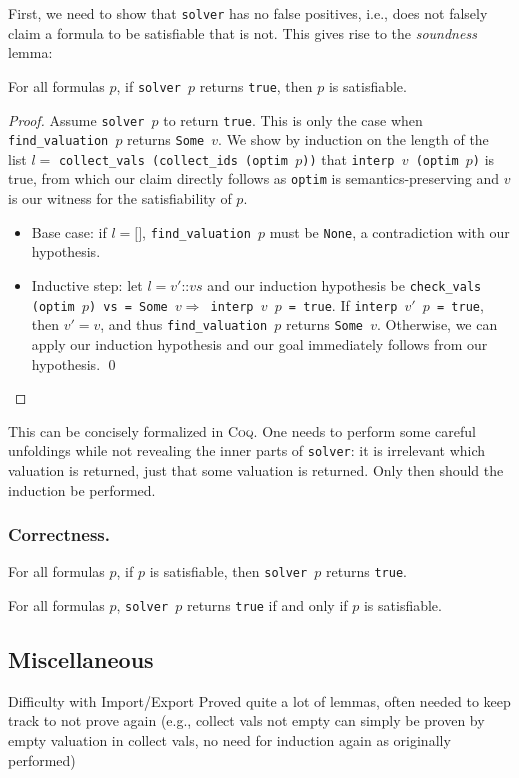 First, we need to show that \texttt{solver} has no false positives, i.e., does not falsely claim a formula to be satisfiable that is not.
This gives rise to the \emph{soundness} lemma:
\begin{lemma}
    For all formulas $p$, if \texttt{solver $p$} returns \texttt{true}, then $p$ is satisfiable.
\end{lemma}
\begin{proof}
    Assume \texttt{solver $p$} to return \texttt{true}.
    This is only the case when \texttt{find\_valuation $p$} returns \texttt{Some $v$}.
    We show by induction on the length of the list $l =$ \texttt{collect\_vals (collect\_ids (optim $p$))} that \texttt{interp $v$ (optim $p$)} is true, from which our claim directly follows as \texttt{optim} is semantics-preserving and $v$ is our witness for the satisfiability of $p$.
    \begin{itemize}
        \item Base case: if $l = \texttt{[]}$, \texttt{find\_valuation $p$} must be \texttt{None}, a contradiction with our hypothesis.
        \item Inductive step: let $l = \texttt{$v'$::$vs$}$ and our induction hypothesis be \texttt{check\_vals (optim $p$) vs = Some $v \Longrightarrow$ interp $v$ $p$ = true}.
        If \texttt{interp $v'$ $p$ = true}, then $v' = v$, and thus \texttt{find\_valuation $p$} returns \texttt{Some $v$}.
        Otherwise, we can apply our induction hypothesis and our goal immediately follows from our hypothesis. \qed
    \end{itemize}
\end{proof}
This can be concisely formalized in \textsc{Coq}.
One needs to perform some careful unfoldings while not revealing the inner parts of \texttt{solver}: it is irrelevant which valuation is returned, just that some valuation is returned.
Only then should the induction be performed.

\subsubsection{Correctness.}

\begin{lemma}
    For all formulas $p$, if $p$ is satisfiable, then \texttt{solver $p$} returns \texttt{true}.
\end{lemma}

\begin{theorem}
    For all formulas $p$, \texttt{solver $p$} returns \texttt{true} if and only if $p$ is satisfiable.
\end{theorem}

\subsection{Miscellaneous}

Difficulty with Import/Export
Proved quite a lot of lemmas, often needed to keep track to not prove again (e.g., collect vals not empty can simply be proven by empty valuation in collect vals, no need for induction again as originally performed)
